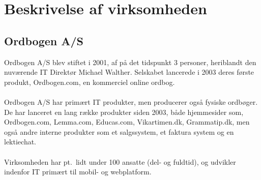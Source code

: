 \section{Beskrivelse af virksomheden}
\subsection{Ordbogen A/S}
Ordbogen A/S blev stiftet i 2001, af på det tidspunkt 3 personer, heriblandt den nuværende IT Direktør Michael Walther. Selskabet lancerede i 2003 deres første produkt, Ordbogen.com, en kommerciel online ordbog.
\\\\
Ordbogen A/S har primært IT produkter, men producerer også fysiske ordbøger. De har lanceret en lang række produkter siden 2003, både hjemmesider som, Ordbogen.com, Lemma.com, Educas.com, Vikartimen.dk, Grammatip.dk,
men også andre interne produkter som et salgssystem, et faktura system og en lektiechat.
\\\\
Virksomheden har pt.\ lidt under 100 ansatte (del- og fuldtid), og udvikler indenfor IT primært til mobil- og webplatform.
